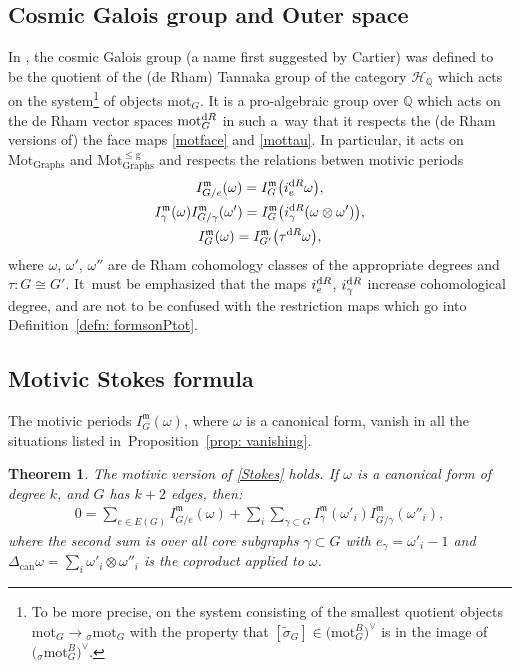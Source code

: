 \documentclass[pdftex]{sigma}%
\newtheorem{thm}{Theorem}[section]
\numberwithin{equation}{section}
\newcommand{\Q}{\mathbb Q}
\newcommand{\can}{\mathrm{can}}
\newcommand{\mm}{\mathfrak{m}}
\newcommand{\0}{\color{blue}{\mathsf{0}}}
\begin{document}
 \subsection{Cosmic Galois group and Outer space}
 In \cite{Cosmic}, the cosmic Galois group (a name first suggested by Cartier) was defined to be the quotient of the (de Rham) Tannaka group of the category $\mathcal{H}_{\Q}$ which acts on the system\footnote{To be more precise, on the system consisting of the smallest quotient objects $\mathrm{mot}_G\rightarrow {}_{\sigma}\mathrm{mot}_G$ with the property that $[\widetilde{\sigma}_G] \in \big(\mathrm{mot}^B_G\big)^{\vee}$ is in the image of $\big({}_{\sigma}\mathrm{mot}^B_G\big)^{\vee}$.}
 of objects $\mathrm{mot}_G$. It is a pro-algebraic group over $\Q$ which acts on the de Rham vector spaces $\mathrm{mot}^{{\rm d}R}_G$ in such a~way that it respects the (de Rham versions of) the face maps \eqref{motface} and \eqref{mottau}. In particular, it acts on $\mathrm{Mot_{Graphs}}$ and
 $\mathrm{Mot_{Graphs}^{\leq g}}$
 and respects the relations betwen motivic periods
 \begin{gather}
I^{\mm}_{G/e}(\omega) = I^{\mm}_{G}\big( i_e^{{\rm d}R} \omega\big),\nonumber
\\
 I^{\mm}_{\gamma}(\omega) I^{\mm}_{G/ \gamma}(\omega') = I^{\mm}_{G}\big(i_{\gamma}^{{\rm d}R} (\omega\otimes \omega')\big) \nonumber,
 \\
 I^{\mm}_{G}( \omega) = I^{\mm}_{G'}\big(\tau^{{\rm d}R} \omega\big),\label{motivicfacerels}
 \end{gather}
 where $\omega$, $\omega'$, $\omega'' $ are de Rham cohomology classes of the appropriate degrees and $\tau\colon G\cong G'$. It~must be emphasized that the maps $i^{{\rm d}R}_e$, $i^{{\rm d}R}_{\gamma} $ increase cohomological degree, and are not to be confused with the restriction maps which go into Definition~\ref{defn: formsonPtot}.

\subsection{Motivic Stokes formula}
The motivic periods $I^{\mm}_G(\omega)$, where $\omega$ is a canonical form, vanish in all the situations listed in~Proposition~\ref{prop: vanishing}.

\begin{thm} The motivic version of \eqref{Stokes} holds. If $\omega$ is a canonical form of degree $k$, and $G$ has $k+2$ edges, then:
\begin{gather} \label{motStokes}
0 = \sum_{e \in E(G)} I^{\mm}_{G/e}(\omega) + \sum_i \sum_{\gamma \subset G} I^{\mm}_{\gamma}(\omega'_i) I^{\mm}_{G/\gamma}(\omega''_i),
 \end{gather}
where the second sum is over all core subgraphs $\gamma \subset G$ with $e_{\gamma} = \omega'_i-1$ and $\Delta_{\can} \omega = \sum_i \omega'_i \otimes \omega''_i$ is the coproduct applied to $\omega$.
\end{thm}
\end{document}
